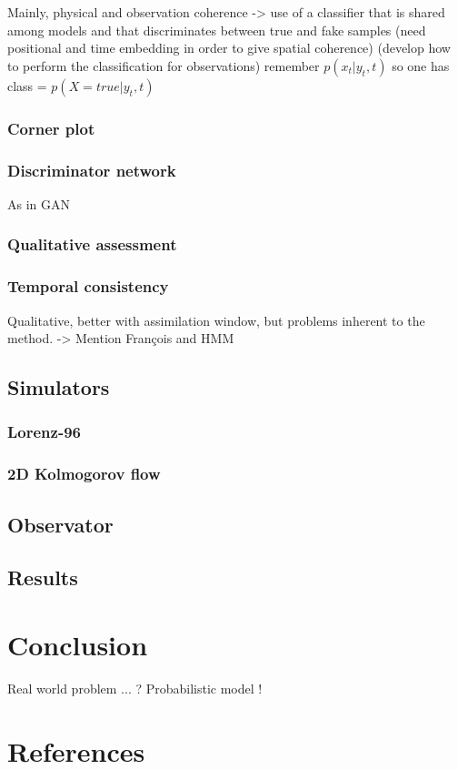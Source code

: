 \documentclass[a4paper, 12pt]{article}
\begin{document}
Mainly, physical and observation coherence 
-> use of a classifier that is shared among models and that discriminates between true and fake samples 
(need positional and time embedding in order to give spatial coherence)
(develop how to perform the classification for observations)
remember $p(x_t|y_t,t)$ so one has class = $p(X = true|y_t, t)$
\subsubsection{Corner plot}
\subsubsection{Discriminator network}
As in GAN 
\subsubsection{Qualitative assessment}
\subsubsection{Temporal consistency}
Qualitative, better with assimilation window, but problems inherent to the method.
-> Mention François and HMM


\subsection{Simulators}
\subsubsection{Lorenz-96}
\subsubsection{2D Kolmogorov flow}
\subsection{Observator}
\subsection{Results}

\section{Conclusion}
Real world problem ... ? 
Probabilistic model !
\section{References}
\end{document}
